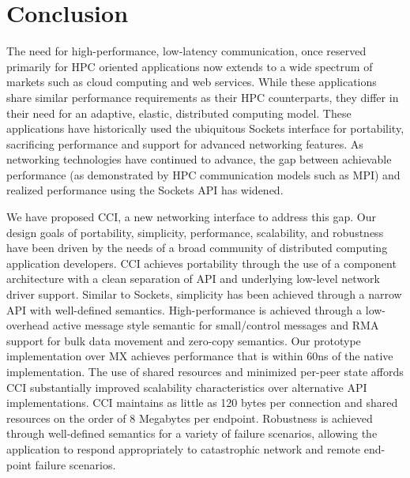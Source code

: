 \section{Conclusion}
\label{sec:conclusion}

The need for high-performance, low-latency communication, once
reserved primarily for HPC oriented applications now extends to a wide
spectrum of markets such as cloud computing and web services. 
While these applications share similar
performance requirements as their HPC counterparts, they differ in
their need for an adaptive, elastic, distributed computing
model. These applications have historically used the ubiquitous
Sockets interface for portability, sacrificing performance and support for advanced
networking features. As networking technologies have
continued to advance, the gap between achievable performance (as
demonstrated by HPC communication models such as MPI) and realized
performance using the Sockets API has widened. 

We have proposed CCI, a new networking interface to address this gap. 
Our design goals of portability, simplicity, performance, scalability,
and robustness have been driven by the needs of a broad community of
distributed computing application developers. CCI achieves portability
through the use of a component architecture with a clean separation of
API and underlying low-level network driver support. Similar to
Sockets, simplicity has been achieved through a narrow API with
well-defined semantics. High-performance is achieved through a
low-overhead active message style semantic for small/control messages
and RMA support for bulk data movement and zero-copy
semantics. Our prototype implementation over MX achieves performance that is
within 60ns of the native implementation. The use of shared
resources and minimized per-peer state affords CCI substantially
improved scalability characteristics over alternative API
implementations. CCI maintains as little as 120 bytes per connection
and shared resources on the order of 8 Megabytes per endpoint. Robustness is
achieved through well-defined semantics for a variety of failure
scenarios, allowing the application to respond appropriately to
catastrophic network and remote end-point failure scenarios.  



